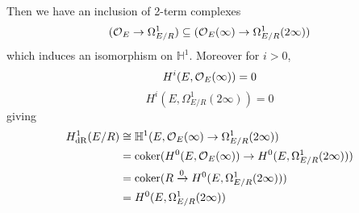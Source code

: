 \begin{frame}
    Then we have an inclusion of 2-term complexes
    \[
        (\operatorname{\mathcal{O}}_E \to \Omega_{E/R}^1) \subseteq (\operatorname{\mathcal{O}}_{E}(\infty) \to  \Omega_{E/R}^1 (2\infty))
    \]
    which induces an isomorphism on $\mathbb H^1$.
    Moreover for $i\gt0$,
    \[ H^i(E, \operatorname{\mathcal{O}}_E(\infty)) = 0 \]
    \[ H^i(E, \Omega^1_{E/R}(2\infty)) = 0 \]
    giving
    \begin{align*}
        H^1_{\mathrm{dR}}(E/R) &\cong \mathbb H^1(E, \operatorname{\mathcal{O}}_E(\infty) \to  \Omega^1_{E/R}(2\infty))\\
          &= \operatorname{coker}( H^0(E, \operatorname{\mathcal{O}}_E(\infty)) \to H^0(E, \Omega^1_{E/R}(2\infty)))\\
                                                                        &= \operatorname{coker}( R \xrightarrow 0  H^0(E, \Omega^1_{E/R}(2\infty)))        \\
                                                                        &= H^0(E, \Omega^1_{E/R}(2\infty))
    \end{align*}
\end{frame}

\begin{frame}
\end{frame}

\begin{frame}
\end{frame}
\begin{frame}

\begin{theorem}
\end{theorem}
\end{frame}



